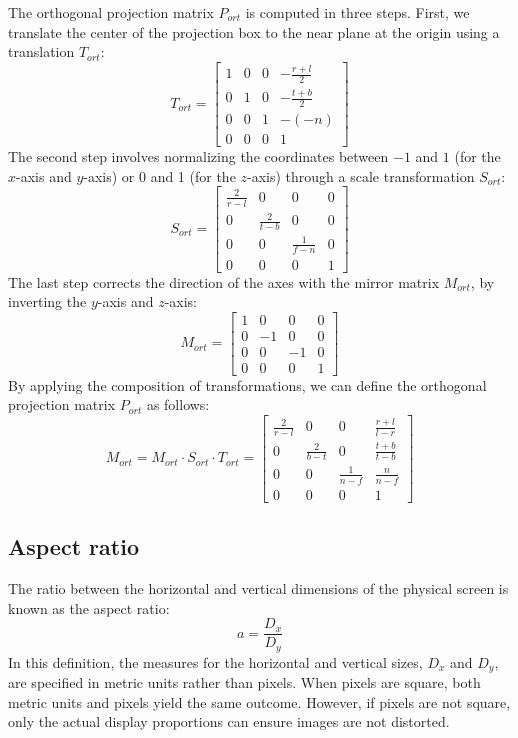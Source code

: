 The orthogonal projection matrix $P_{ort}$ is computed in three steps. 
First, we translate the center of the projection box to the near plane at the origin using a translation $T_{ort}$:
\[T_{ort}=\begin{bmatrix}
    1 & 0 & 0 & -\frac{r+l}{2} \\ 
    0 & 1 & 0 & -\frac{t+b}{2} \\ 
    0 & 0 & 1 & -(-n) \\ 
    0 & 0 & 0 & 1 
\end{bmatrix}\]
The second step involves normalizing the coordinates between $-1$ and $1$ (for the $x$-axis and $y$-axis) or 0 and 1 (for the $z$-axis) through a scale transformation $S_{ort}$:
\[S_{ort}=\begin{bmatrix}
    \frac{2}{r-l} & 0 & 0 & 0 \\ 
    0 & \frac{2}{t-b} & 0 & 0 \\ 
    0 & 0 & \frac{1}{f-n} & 0 \\ 
    0 & 0 & 0 & 1 
\end{bmatrix}\]
The last step corrects the direction of the axes with the mirror matrix $M_{ort}$, by inverting the $y$-axis and $z$-axis:
\[M_{ort}=\begin{bmatrix}
    1 & 0 & 0 & 0 \\ 
    0 & -1 & 0 & 0 \\ 
    0 & 0 & -1 & 0 \\ 
    0 & 0 & 0 & 1 
\end{bmatrix}\]
By applying the composition of transformations, we can define the orthogonal projection matrix $P_{ort}$ as follows:
\[M_{ort}=M_{ort}\cdot S_{ort} \cdot T_{ort}=\begin{bmatrix}
    \frac{2}{r-l} & 0 & 0 & \frac{r+l}{l-r} \\ 
    0 & \frac{2}{b-t} & 0 & \frac{t+b}{t-b} \\ 
    0 & 0 & \frac{1}{n-f} & \frac{n}{n-f} \\ 
    0 & 0 & 0 & 1 
\end{bmatrix}\]

\subsection{Aspect ratio}
The ratio between the horizontal and vertical dimensions of the physical screen is known as the aspect ratio: 
\[a=\dfrac{D_x}{D_y}\]
In this definition, the measures for the horizontal and vertical sizes, $D_x$ and $D_y$, are specified in metric units rather than pixels. 
When pixels are square, both metric units and pixels yield the same outcome. 
However, if pixels are not square, only the actual display proportions can ensure images are not distorted.

